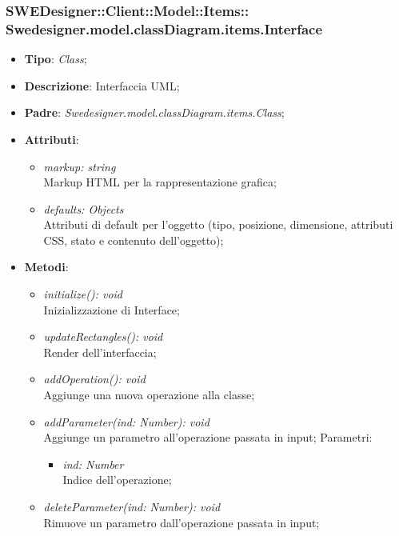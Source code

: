 \documentclass[../DefinizioneDiProdotto.tex]{subfiles}
\begin{document}
			\subsubsection[Swedesigner.model.classDiagram.items.Interface]{SWEDesigner::Client::Model::Items::\\Swedesigner.model.classDiagram.items.Interface}
			\hypertarget{SWEDesigner::Client::Model::Items::Swedesigner.model.classDiagram.items.Interface}{}
			\begin{itemize}
				\item \textbf{Tipo}: \emph{Class};
				\item \textbf{Descrizione}: Interfaccia UML;
				\item \textbf{Padre}: \emph{Swedesigner.model.classDiagram.items.Class};
				\item \textbf{Attributi}:
				\begin{itemize}
					\item \emph{markup: string}\\
					Markup HTML per la rappresentazione grafica;
					\item \emph{defaults: Objects}\\
					Attributi di default per l'oggetto (tipo, posizione, dimensione, attributi CSS, stato e contenuto dell'oggetto);
				\end{itemize}
				\item \textbf{Metodi}:
				\begin{itemize}
					\item \emph{initialize(): void}\\
					Inizializzazione di Interface;
					\item \emph{updateRectangles(): void}\\
					Render dell'interfaccia;
					\item \emph{addOperation(): void}\\
					Aggiunge una nuova operazione alla classe;	
					\item \emph{addParameter(ind: Number): void}\\
					Aggiunge un parametro all'operazione passata in input;
					Parametri:
					\begin{itemize}
						\item \emph{ind: Number} \\
						Indice dell'operazione;
					\end{itemize}
					\item \emph{deleteParameter(ind: Number): void}\\
					Rimuove un parametro dall'operazione passata in input;

\end{itemize}
\end{itemize}
\end{document}
